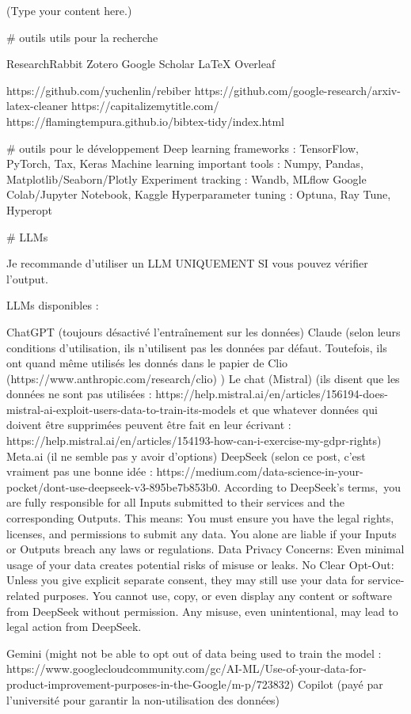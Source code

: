 \documentclass{article}
\begin{document}
(Type your content here.)

# outils utils pour la recherche

ResearchRabbit
Zotero
Google Scholar
LaTeX
Overleaf

https://github.com/yuchenlin/rebiber
https://github.com/google-research/arxiv-latex-cleaner 
https://capitalizemytitle.com/
https://flamingtempura.github.io/bibtex-tidy/index.html 

# outils pour le développement
Deep learning frameworks : TensorFlow, PyTorch, Tax, Keras
Machine learning important tools : Numpy, Pandas, Matplotlib/Seaborn/Plotly
Experiment tracking : Wandb, MLflow
Google Colab/Jupyter Notebook, Kaggle
Hyperparameter tuning : Optuna, Ray Tune, Hyperopt

# LLMs 

Je recommande d’utiliser un LLM UNIQUEMENT SI vous pouvez vérifier l’output. 

LLMs disponibles : 

ChatGPT (toujours désactivé l’entraînement sur les données)
Claude (selon leurs conditions d’utilisation, ils n’utilisent pas les données par défaut. Toutefois, ils ont quand même utilisés les donnés dans le papier de Clio (https://www.anthropic.com/research/clio) )
Le chat (Mistral) (ils disent que les données ne sont pas utilisées : https://help.mistral.ai/en/articles/156194-does-mistral-ai-exploit-users-data-to-train-its-models et que whatever données qui doivent être supprimées peuvent être fait en leur écrivant : https://help.mistral.ai/en/articles/154193-how-can-i-exercise-my-gdpr-rights) 
Meta.ai (il ne semble pas y avoir d’options)
DeepSeek (selon ce post, c’est vraiment pas une bonne idée : https://medium.com/data-science-in-your-pocket/dont-use-deepseek-v3-895be7b853b0. 
According to DeepSeek’s terms, you are fully responsible for all Inputs submitted to their services and the corresponding Outputs. This means:
You must ensure you have the legal rights, licenses, and permissions to submit any data.
You alone are liable if your Inputs or Outputs breach any laws or regulations.
Data Privacy Concerns: Even minimal usage of your data creates potential risks of misuse or leaks.
No Clear Opt-Out: Unless you give explicit separate consent, they may still use your data for service-related purposes.
You cannot use, copy, or even display any content or software from DeepSeek without permission.
Any misuse, even unintentional, may lead to legal action from DeepSeek.

 
Gemini (might not be able to opt out of data being used to train the model : https://www.googlecloudcommunity.com/gc/AI-ML/Use-of-your-data-for-product-improvement-purposes-in-the-Google/m-p/723832) 
Copilot (payé par l’université pour garantir la non-utilisation des données)
\end{document}
